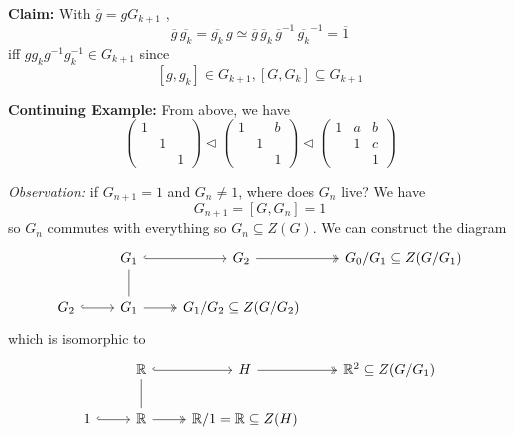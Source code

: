 \documentclass[12pt]{article}
\newcommand{\R}{\mathbb{R}}
\renewcommand{\bar}{\overline}
\begin{document}
    \textbf{Claim:} With $\bar g = gG_{k+1}$ , 
    \[\bar g\, \bar{g_k} = \bar{g_k}\,g \simeq \bar g\, \bar g_k\, {\bar g}^{-1}\, \bar{g_k}^{-1} = \bar 1\] 
    iff $gg_kg^{-1}g_k^{-1} \in G_{k+1}$ since 
    \[[g, g_k] \in G_{k+1}, [G, G_k] \subseteq G_{k+1} \]


    \textbf{Continuing Example:} From above, we have 
    \[\begin{pmatrix}
        1\\ 
        & 1\\
        & & 1
    \end{pmatrix} \triangleleft \begin{pmatrix}
        1 & & b\\ 
        & 1\\
        & & 1
    \end{pmatrix} \triangleleft \begin{pmatrix}
        1 & a& b\\ 
        & 1 & c\\
        & & 1
    \end{pmatrix}\]

    \emph{Observation:} if $G_{n+1} = 1$ and $G_n \neq 1$, where does $G_n$ live? We have 
    \[G_{n+1} = [G, G_n] = 1\]
    so $G_n$ commutes with everything so $G_n \subseteq Z(G)$. We can construct the diagram 
    \[\begin{tikzcd}
        & G_1 \arrow[hook]{r} & G_2 \arrow[two heads]{r} & G_0/G_1 \subseteq Z(G/G_1)\\ 
        G_2 \arrow[hook]{r} & G_1 \arrow[no head]{u} \arrow[two heads]{r} & G_1/G_2 \subseteq Z(G/G_2)
    \end{tikzcd}\] 
    which is isomorphic to 
    \[\begin{tikzcd}
        & \R \arrow[hook]{r} & H \arrow[two heads]{r} & \R^2 \subseteq Z(G/G_1)\\ 
        1 \arrow[hook]{r} & \R \arrow[no head]{u} \arrow[two heads]{r} &  \R/1 = \R \subseteq Z(H)
    \end{tikzcd}\]
\end{document}
